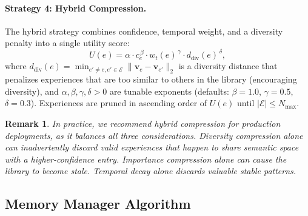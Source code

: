 \documentclass[11pt]{article}
\newtheorem{remark}{Remark}
\begin{document}
\paragraph{Strategy 4: Hybrid Compression.}
The hybrid strategy combines confidence, temporal weight, and a diversity
penalty into a single utility score:
\begin{equation}
    U(e) = \alpha \cdot c_e^{\,\beta} \cdot w_t(e)^{\,\gamma} \cdot d_{\text{div}}(e)^{\,\delta},
    \label{eq:hybrid-utility}
\end{equation}
where $d_{\text{div}}(e) = \min_{e' \neq e, e' \in \mathcal{E}}\|\bm{v}_e - \bm{v}_{e'}\|_2$
is a diversity distance that penalizes experiences that are too similar to
others in the library (encouraging diversity), and $\alpha, \beta, \gamma, \delta > 0$
are tunable exponents (defaults: $\beta = 1.0$, $\gamma = 0.5$, $\delta = 0.3$).
Experiences are pruned in ascending order of $U(e)$ until $|\mathcal{E}| \leq N_{\max}$.

\begin{remark}
In practice, we recommend hybrid compression for production deployments, as
it balances all three considerations. Diversity compression alone can
inadvertently discard valid experiences that happen to share semantic space
with a higher-confidence entry. Importance compression alone can cause the
library to become stale. Temporal decay alone discards valuable stable patterns.
\end{remark}

\subsection{Memory Manager Algorithm}
\end{document}
